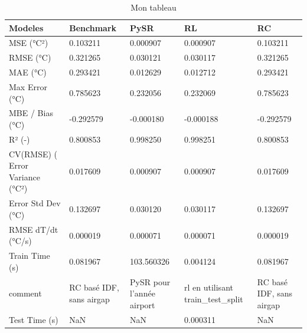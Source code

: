 \begin{table}
\caption{Mon tableau}
\label{tab:mon_tableau}
\begin{tabular}{lllll}
\toprule
Modeles & Benchmark & PySR & RL & RC \\
\midrule
MSE (°C²) & 0.103211 & 0.000907 & 0.000907 & 0.103211 \\
RMSE (°C) & 0.321265 & 0.030121 & 0.030117 & 0.321265 \\
MAE (°C) & 0.293421 & 0.012629 & 0.012712 & 0.293421 \\
Max Error (°C) & 0.785623 & 0.232056 & 0.232069 & 0.785623 \\
MBE / Bias (°C) & -0.292579 & -0.000180 & -0.000188 & -0.292579 \\
R² (-) & 0.800853 & 0.998250 & 0.998251 & 0.800853 \\
CV(RMSE) (%
Error Variance (°C²) & 0.017609 & 0.000907 & 0.000907 & 0.017609 \\
Error Std Dev (°C) & 0.132697 & 0.030120 & 0.030117 & 0.132697 \\
RMSE dT/dt (°C/s) & 0.000019 & 0.000071 & 0.000071 & 0.000019 \\
Train Time (s) & 0.081967 & 103.560326 & 0.004124 & 0.081967 \\
comment & RC basé IDF, sans airgap & PySR pour l'année airport & rl en utilisant train_test_split & RC basé IDF, sans airgap \\
Test Time (s) & NaN & NaN & 0.000311 & NaN \\
\bottomrule
\end{tabular}
\end{table}
